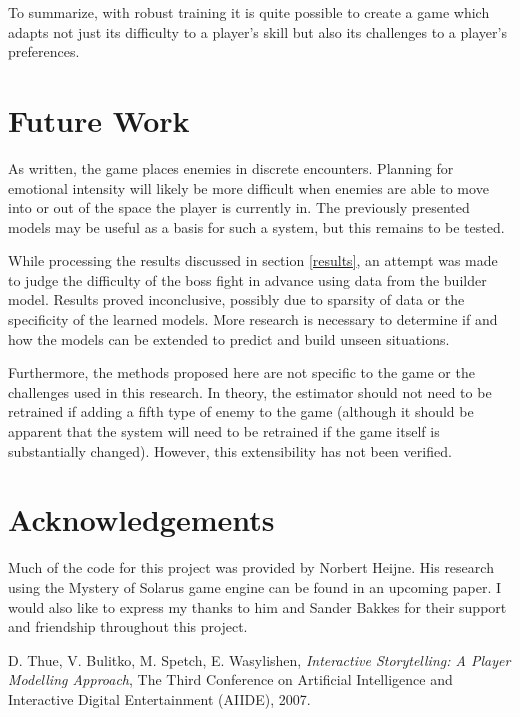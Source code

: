 \documentclass[a4paper]{article}
\begin{document}
\begin{multicols*}{2}
To summarize, with robust training it is quite possible to create a game which adapts not just its difficulty to a player's skill but also its challenges to a player's preferences.

\section{Future Work}
As written, the game places enemies in discrete encounters. Planning for emotional intensity will likely be more difficult when enemies are able to move into or out of the space the player is currently in. The previously presented models may be useful as a basis for such a system, but this remains to be tested.

While processing the results discussed in section \ref{results}, an attempt was made to judge the difficulty of the boss fight in advance using data from the builder model. Results proved inconclusive, possibly due to sparsity of data or the specificity of the learned models. More research is necessary to determine if and how the models can be extended to predict and build unseen situations.

Furthermore, the methods proposed here are not specific to the game or the challenges used in this research. In theory, the estimator should not need to be retrained if adding a fifth type of enemy to the game (although it should be apparent that the system will need to be retrained if the game itself is substantially changed). However, this extensibility has not been verified.


\section{Acknowledgements}
Much of the code for this project was provided by Norbert Heijne. His research using the Mystery of Solarus game engine can be found in an upcoming paper. I would also like to express my thanks to him and Sander Bakkes for their support and friendship throughout this project.


\begin{thebibliography}{9}

D. Thue, V. Bulitko, M. Spetch, E. Wasylishen,
\emph{Interactive Storytelling: A Player Modelling Approach},
The Third Conference on
Artificial Intelligence and Interactive Digital Entertainment (AIIDE),
2007.


\end{thebibliography}
\end{multicols*}
\end{document}
